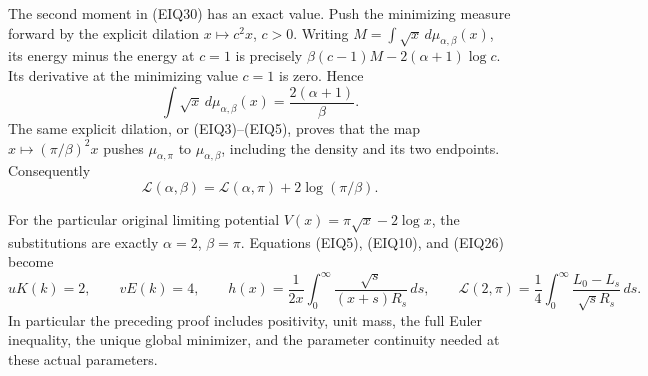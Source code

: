 The second moment in (EIQ30) has an exact value.  Push the minimizing
measure forward by the explicit dilation $x\mapsto c^2x$, $c>0$.
Writing $M=\int\sqrt{x}\,d\mu_{\alpha,\beta}(x)$, its energy minus
the energy at $c=1$ is precisely
$\beta(c-1)M-2(\alpha+1)\log c$.
Its derivative at the minimizing value $c=1$ is zero. Hence
\begin{equation}\tag{EIQ31}
 \int\sqrt{x}\,d\mu_{\alpha,\beta}(x)
       =\frac{2(\alpha+1)}\beta.
\end{equation}
The same explicit dilation, or (EIQ3)--(EIQ5), proves that the map
$x\mapsto(\pi/\beta)^2x$ pushes $\mu_{\alpha,\pi}$ to
$\mu_{\alpha,\beta}$, including the density and its two endpoints.
Consequently
\begin{equation}\tag{EIQ32}
 \mathcal L(\alpha,\beta)
       =\mathcal L(\alpha,\pi)+2\log(\pi/\beta).
\end{equation}

For the particular original limiting potential
$V(x)=\pi\sqrt{x}-2\log x$, the substitutions are exactly
$\alpha=2$, $\beta=\pi$. Equations (EIQ5), (EIQ10), and (EIQ26) become
\begin{equation}\tag{EIQ33}
 uK(k)=2,\qquad vE(k)=4,\qquad
 h(x)=\frac1{2x}\int_0^\infty\frac{\sqrt s}{(x+s)R_s}\,ds,
 \qquad
 \mathcal L(2,\pi)=\frac14\int_0^\infty
                         \frac{L_0-L_s}{\sqrt sR_s}\,ds.
\end{equation}
In particular the preceding proof includes positivity, unit mass,
the full Euler inequality, the unique global minimizer, and the
parameter continuity needed at these actual parameters.
